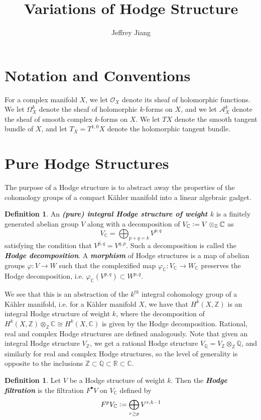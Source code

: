 \documentclass[psamsfonts, 12pt]{amsart}
\theoremstyle{definition}
\newtheorem{defn}[thm]{Definition}
\theoremstyle{remark}
\renewcommand{\O}{\mathcal{O}}
\newcommand{\R}{\mathbb{R}}
\newcommand{\ib}[1]{\textbf{\textit{#1}}}
\newcommand{\Q}{\mathbb{Q}}
\newcommand{\Z}{\mathbb{Z}}
\newcommand{\C}{\mathbb{C}}
\newcommand{\defeq}{\vcentcolon=}
\begin{document}
%
\author{Jeffrey Jiang}
%
\title{Variations of Hodge Structure}
%
\maketitle
%
\tableofcontents
%
\section*{Notation and Conventions}
%
For a complex manifold $X$, we let $\O_X$ denote its sheaf of holomorphic functions.
We let $\Omega^k_X$ denote the sheaf of holomorphic $k$-forms on $X$, and
we let $\mathcal{A}^k_X$ denote the sheaf of smooth complex $k$-forms on $X$.
We let $TX$ denote the smooth tangent bundle of $X$, and let $T_X = T^{1,0}X$
denote the holomorphic tangent bundle.

%
\section{Pure Hodge Structures}
%
The purpose of a Hodge structure is to abstract away the properties of the
cohomology groups of a compact K\"ahler manifold into a linear algebraic gadget.
%
\begin{defn}
An \ib{(pure) integral Hodge structure of weight $k$} is a finitely
generated abelian group $V$ along with a decomposition of
$V_\C \defeq V \otimes_\Z \C$ as
\[
V_\C = \bigoplus_{p+q=k} V^{p,q}
\]
satisfying the condition that $\overline{V^{p,q}} = V^{q,p}$. Such a decomposition
is called the \ib{Hodge decomposition}. A \ib{morphism} of Hodge structures is a map
of abelian groups $\varphi : V \to W$ such that the complexified map
$\varphi_\C : V_\C \to W_\C$ preserves the Hodge decomposition, i.e.
$\varphi_\C(V^{p,q}) \subset W^{p,q}$.
\end{defn}
%
We see that this is an abstraction of the $k^{th}$ integral cohomology group of a
K\"ahler manifold, i.e. for a K\"ahler manifold $X$, we have that
$H^k(X,\Z)$ is an integral Hodge structure of weight $k$, where the decomposition
of $H^k(X,\Z)\otimes_\Z \C \cong H^k(X,\C)$ is given by the Hodge decomposition.
Rational, real and complex Hodge structures are defined analogously. Note
that given an integral Hodge structure $V_\Z$, we get a rational
Hodge structure $V_\Q = V_\Z \otimes_\Z \Q$, and similarly for real and
complex Hodge structures, so the level of generality is opposite to the
inclusions $\Z \subset \Q \subset \R \subset \C$.
%
\begin{defn}
Let $V$ be a Hodge structure of weight $k$. Then the \ib{Hodge filtration} is
the filtration $F^\bullet V$ on $V_\C$ defined by
\[
F^pV_\C \defeq \bigoplus_{r \geq p} V^{r,k-1}
\]
\end{defn}
\end{document}
